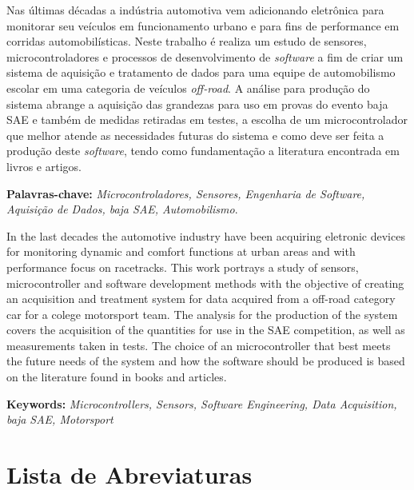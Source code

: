 


\noindent Nas últimas décadas a indústria automotiva vem adicionando eletrônica para monitorar seu veículos em funcionamento urbano e para fins de performance em corridas automobilísticas. Neste trabalho é realiza um estudo de sensores, microcontroladores e processos de desenvolvimento de \textit{software} a fim de criar um sistema de aquisição e tratamento de dados para uma equipe de automobilismo escolar em uma categoria de veículos \textit{off-road}. A análise para produção do sistema abrange a aquisição das grandezas para uso em provas do evento baja SAE e também de medidas retiradas em testes, a escolha de um microcontrolador que melhor atende as necessidades futuras do sistema e como deve ser feita a produção deste \textit{software}, tendo como fundamentação a literatura encontrada em livros e artigos.  

\textbf{Palavras-chave:} \textit{Microcontroladores, Sensores, Engenharia de Software, Aquisição de Dados, baja SAE, Automobilismo}.



\noindent In the last decades the automotive industry have been acquiring eletronic devices for monitoring dynamic and comfort functions at urban areas and with performance focus on racetracks. This work portrays a study of sensors, microcontroller and software development methods with the objective of creating an acquisition and treatment system for data acquired from a off-road category car for a colege motorsport team. The analysis for the production of the system covers the acquisition of the quantities for use in the SAE competition, as well as measurements taken in tests. The choice of an microcontroller that best meets the future needs of the system and how the software should be produced is based on the literature found in books and articles.   


\noindent \textbf{Keywords:} \textit{Microcontrollers, Sensors, Software Engineering, Data Acquisition, baja SAE, Motorsport} 

\tableofcontents
\listoffigures
\listoftables
\newpage
\chapter*{Lista de Abreviaturas\hfill} 
\listofsymbols

\newpage
\pagestyle{myheadings}
